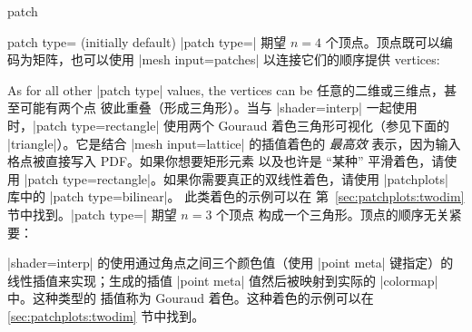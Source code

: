 {\begin{plottype}[/pgfplots]{patch}
\begin{pgfplotskey}{patch type= (initially default)}
        |patch type=| 期望 $n=4$
        个顶点。顶点既可以编码为矩阵，也可以使用
        |mesh input=patches| 以连接它们的顺序提供
        vertices:
\begin{codeexample}[]
\end{codeexample}

\begin{codeexample}[]
\end{codeexample}
        \noindent As for all other |patch type| values, the vertices can be
        任意的二维或三维点，甚至可能有两个点
        彼此重叠（形成三角形）。当与
        |shader=interp| 一起使用时，|patch type=rectangle| 使用两个 Gouraud
        着色三角形可视化（参见下面的 |triangle|）。它是结合
        |mesh input=lattice| 的插值着色的 \emph{最高效}
        表示，因为输入格点被直接写入
        PDF。如果你想要矩形元素
        以及也许是 ``某种'' 平滑着色，请使用 |patch type=rectangle|。如果你需要真正的双线性着色，请使用
        |patchplots| 库中的 |patch type=bilinear|。
        此类着色的示例可以在
        第~\ref{sec:patchplots:twodim} 节中找到。|patch type=|
        期望 $n=3$ 个顶点
        构成一个三角形。顶点的顺序无关紧要：
\begin{codeexample}[]
\end{codeexample}
        \noindent |shader=interp| 的使用通过角点之间三个颜色值（使用
        |point meta| 键指定）的线性插值来实现；生成的插值
        |point meta| 值然后被映射到实际的 |colormap| 中。这种类型的
        插值称为 Gouraud 着色。这种着色的示例可以在
        \ref{sec:patchplots:twodim} 节中找到。


\end{pgfplotskey}
\end{plottype}}
